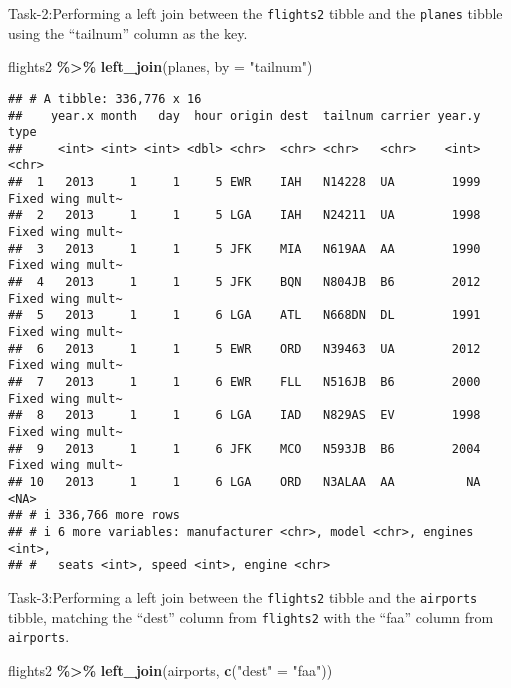 \documentclass[
]{article}
\newenvironment{Shaded}{\begin{snugshade}}{\end{snugshade}}
\newcommand{\AttributeTok}[1]{\textcolor[rgb]{0.13,0.29,0.53}{#1}}
\newcommand{\FunctionTok}[1]{\textcolor[rgb]{0.13,0.29,0.53}{\textbf{#1}}}
\newcommand{\NormalTok}[1]{#1}
\newcommand{\OtherTok}[1]{\textcolor[rgb]{0.56,0.35,0.01}{#1}}
\newcommand{\SpecialCharTok}[1]{\textcolor[rgb]{0.81,0.36,0.00}{\textbf{#1}}}
\newcommand{\StringTok}[1]{\textcolor[rgb]{0.31,0.60,0.02}{#1}}
\begin{document}
Task-2:Performing a left join between the \texttt{flights2} tibble and
the \texttt{planes} tibble using the ``tailnum'' column as the key.

\begin{Shaded}
\begin{Highlighting}[]
\NormalTok{flights2 }\SpecialCharTok{\%\textgreater{}\%} 
  \FunctionTok{left\_join}\NormalTok{(planes, }\AttributeTok{by =} \StringTok{"tailnum"}\NormalTok{)}
\end{Highlighting}
\end{Shaded}

\begin{verbatim}
## # A tibble: 336,776 x 16
##    year.x month   day  hour origin dest  tailnum carrier year.y type            
##     <int> <int> <int> <dbl> <chr>  <chr> <chr>   <chr>    <int> <chr>           
##  1   2013     1     1     5 EWR    IAH   N14228  UA        1999 Fixed wing mult~
##  2   2013     1     1     5 LGA    IAH   N24211  UA        1998 Fixed wing mult~
##  3   2013     1     1     5 JFK    MIA   N619AA  AA        1990 Fixed wing mult~
##  4   2013     1     1     5 JFK    BQN   N804JB  B6        2012 Fixed wing mult~
##  5   2013     1     1     6 LGA    ATL   N668DN  DL        1991 Fixed wing mult~
##  6   2013     1     1     5 EWR    ORD   N39463  UA        2012 Fixed wing mult~
##  7   2013     1     1     6 EWR    FLL   N516JB  B6        2000 Fixed wing mult~
##  8   2013     1     1     6 LGA    IAD   N829AS  EV        1998 Fixed wing mult~
##  9   2013     1     1     6 JFK    MCO   N593JB  B6        2004 Fixed wing mult~
## 10   2013     1     1     6 LGA    ORD   N3ALAA  AA          NA <NA>            
## # i 336,766 more rows
## # i 6 more variables: manufacturer <chr>, model <chr>, engines <int>,
## #   seats <int>, speed <int>, engine <chr>
\end{verbatim}

Task-3:Performing a left join between the \texttt{flights2} tibble and
the \texttt{airports} tibble, matching the ``dest'' column from
\texttt{flights2} with the ``faa'' column from \texttt{airports}.

\begin{Shaded}
\begin{Highlighting}[]
\NormalTok{flights2 }\SpecialCharTok{\%\textgreater{}\%} 
  \FunctionTok{left\_join}\NormalTok{(airports, }\FunctionTok{c}\NormalTok{(}\StringTok{"dest"} \OtherTok{=} \StringTok{"faa"}\NormalTok{))}
\end{Highlighting}
\end{Shaded}
\end{document}
